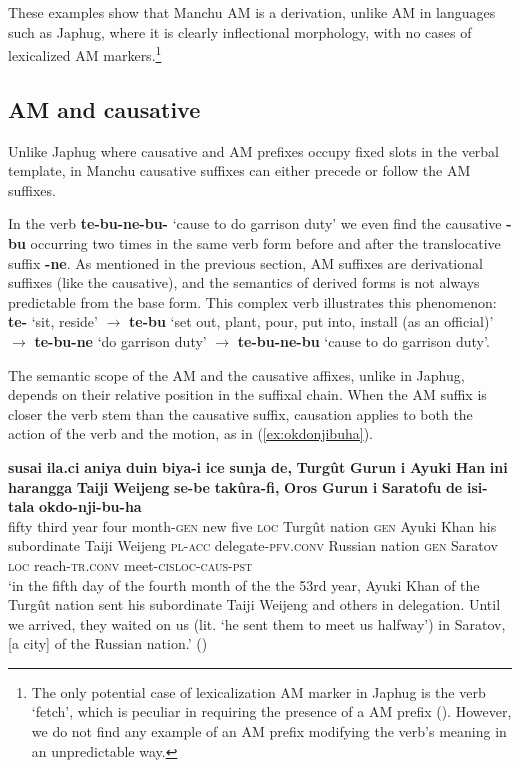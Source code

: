\documentclass{article}
\newcommand{\ipa}[1]{\textbf{{\phon\mbox{#1}}}} %
\begin{document}
These examples show that Manchu AM is a derivation, unlike AM in languages such as Japhug, where it is clearly inflectional morphology, with no cases of lexicalized AM markers.\footnote{The only potential case of lexicalization AM marker in Japhug is the verb `fetch', which is peculiar in requiring the presence of a AM prefix (\citealt[210]{jacques13harmonization}). However, we do not find any example of an AM prefix modifying the verb's meaning in an unpredictable way.}



\subsection{AM and causative} \label{sec:manchu.caus}

Unlike Japhug where causative and AM prefixes occupy fixed slots in the verbal template, in Manchu causative suffixes can either precede or follow the AM suffixes. 

In the verb \ipa{te-bu-ne-bu-} `cause to do garrison duty' we even find the causative \ipa{-bu} occurring two times in the same verb form before and after the translocative suffix \ipa{-ne}. As mentioned in the previous section, AM suffixes are derivational suffixes (like the causative), and the semantics of derived forms is not always predictable from the base form. This complex verb illustrates this phenomenon: \ipa{te-} `sit, reside' $\rightarrow$ \ipa{te-bu} `set out, plant, pour, put into, install (as an official)' $\rightarrow$ \ipa{te-bu-ne} `do garrison duty'
$\rightarrow$ \ipa{te-bu-ne-bu} `cause to do garrison duty'.

The semantic scope of the AM and the causative affixes, unlike in Japhug, depends on their relative position in the suffixal chain. When the AM suffix is closer the verb stem than the causative suffix, causation applies to both the action of the verb and the motion, as in (\ref{ex:okdonjibuha}).

\begin{exe}
\ex \label{ex:okdonjibuha}
\gll 
\ipa{susai}	\ipa{ila.ci}	\ipa{aniya}	\ipa{duin}	\ipa{biya-i}	\ipa{ice}	\ipa{sunja}	\ipa{de,}	\ipa{Turgût}	\ipa{Gurun}	\ipa{i}	\ipa{Ayuki}	\ipa{Han}	\ipa{ini}	\ipa{harangga}	\ipa{Taiji}	\ipa{Weijeng}	\ipa{se-be}	\ipa{takûra-fi,}	\ipa{Oros}	\ipa{Gurun}	\ipa{i}	\ipa{Saratofu}	\ipa{de}	\ipa{isi-tala}	\ipa{okdo-nji-bu-ha} \\
fifty third year four month-\textsc{gen} new five \textsc{loc} Turgût nation \textsc{gen} Ayuki Khan his subordinate Taiji Weijeng \textsc{pl-acc} delegate-\textsc{pfv.conv} Russian nation \textsc{gen} Saratov \textsc{loc} reach-\textsc{tr.conv} meet-\textsc{cisloc-caus-pst} \\
\glt ‘in the fifth day of the fourth month of the the 53rd year, Ayuki Khan of the Turgût nation sent his subordinate Taiji Weijeng and others in delegation. Until we arrived,
they waited on us (lit. `he sent them to meet us halfway’) in Saratov, [a city] of the Russian nation.’ (\citealt[175;88b-89a]{shunjuu64tulishen})
\end{exe}
\end{document}
